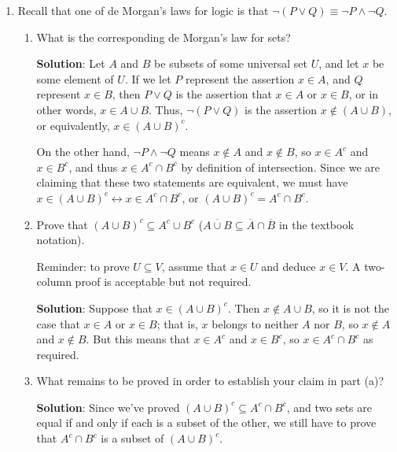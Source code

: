 \documentclass[12pt]{article}
\newcommand{\points}[1]{\marginpar{\hspace{24pt}[#1]}}
\begin{document}
\begin{enumerate}
\begin{enumerate}
\end{enumerate}
\newpage

\item Recall that one of de Morgan's laws for logic is that $\neg (P\vee Q) \equiv \neg P\wedge \neg Q$.
\begin{enumerate}
 \item What is the corresponding de Morgan's law for sets?\points{1}

\bigskip

{\bf Solution}: Let $A$ and $B$ be subsets of some universal set $U$, and let $x$ be some element of $U$. If we let $P$ represent the assertion $x\in A$, and $Q$ represent $x\in B$, then $P\vee Q$ is the assertion that $x\in A$ or $x\in B$, or in other words, $x\in A\cup B$. Thus, $\neg (P\vee Q)$ is the assertion $x\notin (A\cup B)$, or equivalently, $x\in (A\cup B)^c$.

On the other hand, $\neg P\wedge \neg Q$ means $x\notin A$ and $x\notin B$, so $x\in A^c$ and $x\in B^c$, and thus $x\in A^c\cap B^c$ by definition of intersection. Since we are claiming that these two statements are equivalent, we must have $x\in (A\cup B)^c \leftrightarrow x\in A^c\cap B^c$, or $(A\cup B)^c = A^c\cap B^c$.

 \bigskip

 \item Prove that $(A\cup B)^c \subseteq A^c\cup B^c$ ($\overline{A\cup B}\subseteq \overline{A}\cap \overline{B}$ in the textbook notation). \points{3}

Reminder: to prove $U\subseteq V$, assume that $x\in U$ and deduce $x\in V$. A two-column proof is acceptable but not required.

\bigskip

{\bf Solution}: Suppose that $x\in (A\cup B)^c$. Then $x\notin A\cup B$, so it is not the case that $x\in A$ or $x\in B$; that is, $x$ belongs to neither $A$ nor $B$, so $x\notin A$ and $x\notin B$. But this means that $x\in A^c$ and $x\in B^c$, so $x\in A^c\cap B^c$ as required.

\bigskip

 \item What remains to be proved in order to establish your claim in part (a)? \points{1}

\bigskip

{\bf Solution}: Since we've proved $(A\cup B)^c \subseteq A^c\cap B^c$, and two sets are equal if and only if each is a subset of the other, we still have to prove that $A^c\cap B^c$ is a subset of $(A\cup B)^c$.
\end{enumerate}

\end{enumerate}
\end{document}
